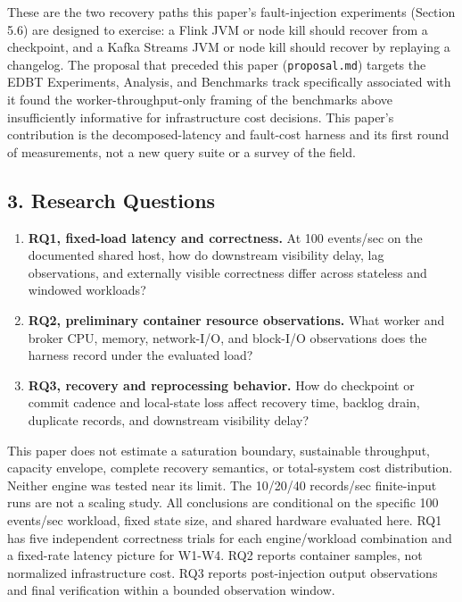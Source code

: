 \documentclass[
]{article}
\providecommand{\tightlist}{%
  \setlength{\itemsep}{0pt}\setlength{\parskip}{0pt}}
\begin{document}
These are the two recovery paths this paper's fault-injection
experiments (Section 5.6) are designed to exercise: a Flink JVM or node
kill should recover from a checkpoint, and a Kafka Streams JVM or node
kill should recover by replaying a changelog. The proposal that preceded
this paper (\texttt{proposal.md}) targets the EDBT Experiments,
Analysis, and Benchmarks track specifically associated with it found the
worker-throughput-only framing of the benchmarks above insufficiently
informative for infrastructure cost decisions. This paper's contribution
is the decomposed-latency and fault-cost harness and its first round of
measurements, not a new query suite or a survey of the field.

\hypertarget{research-questions}{%
\subsection{3. Research Questions}\label{research-questions}}

\begin{enumerate}
\def\labelenumi{\arabic{enumi}.}
\tightlist
\item
  \textbf{RQ1, fixed-load latency and correctness.} At 100 events/sec on
  the documented shared host, how do downstream visibility delay, lag
  observations, and externally visible correctness differ across
  stateless and windowed workloads?
\item
  \textbf{RQ2, preliminary container resource observations.} What worker
  and broker CPU, memory, network-I/O, and block-I/O observations does
  the harness record under the evaluated load?
\item
  \textbf{RQ3, recovery and reprocessing behavior.} How do checkpoint or
  commit cadence and local-state loss affect recovery time, backlog
  drain, duplicate records, and downstream visibility delay?
\end{enumerate}

This paper does not estimate a saturation boundary, sustainable throughput, capacity envelope, complete recovery semantics, or total-system cost distribution. Neither engine was tested near its limit. The 10/20/40 records/sec finite-input runs are not a scaling study. All conclusions are conditional on the specific 100 events/sec workload, fixed state size, and shared hardware evaluated here. RQ1 has five independent correctness trials for each engine/workload combination and a fixed-rate latency picture for W1-W4. RQ2 reports container samples, not normalized infrastructure cost. RQ3 reports post-injection output observations and final verification within a bounded observation window.
\end{document}
